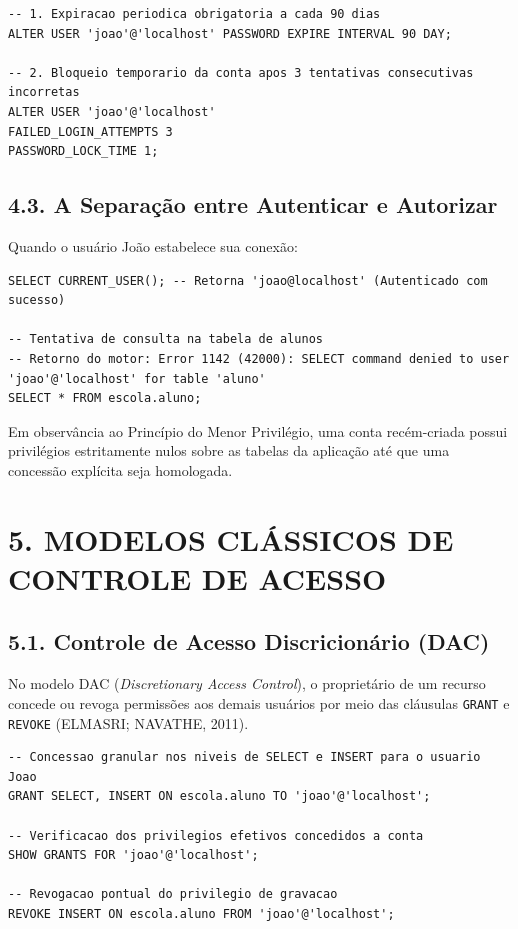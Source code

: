 \begin{lstlisting}
-- 1. Expiracao periodica obrigatoria a cada 90 dias
ALTER USER 'joao'@'localhost' PASSWORD EXPIRE INTERVAL 90 DAY;

-- 2. Bloqueio temporario da conta apos 3 tentativas consecutivas incorretas
ALTER USER 'joao'@'localhost'
FAILED_LOGIN_ATTEMPTS 3
PASSWORD_LOCK_TIME 1;
\end{lstlisting}

\subsection*{4.3. A Separação entre Autenticar e Autorizar}

Quando o usuário João estabelece sua conexão:
\begin{lstlisting}
SELECT CURRENT_USER(); -- Retorna 'joao@localhost' (Autenticado com sucesso)

-- Tentativa de consulta na tabela de alunos
-- Retorno do motor: Error 1142 (42000): SELECT command denied to user 'joao'@'localhost' for table 'aluno'
SELECT * FROM escola.aluno;
\end{lstlisting}

Em observância ao Princípio do Menor Privilégio, uma conta recém-criada possui privilégios estritamente nulos sobre as tabelas da aplicação até que uma concessão explícita seja homologada.

\newpage

\section*{5. MODELOS CLÁSSICOS DE CONTROLE DE ACESSO}

\subsection*{5.1. Controle de Acesso Discricionário (DAC)}

No modelo DAC (\textit{Discretionary Access Control}), o proprietário de um recurso concede ou revoga permissões aos demais usuários por meio das cláusulas \texttt{GRANT} e \texttt{REVOKE} (ELMASRI; NAVATHE, 2011).

\begin{lstlisting}
-- Concessao granular nos niveis de SELECT e INSERT para o usuario Joao
GRANT SELECT, INSERT ON escola.aluno TO 'joao'@'localhost';

-- Verificacao dos privilegios efetivos concedidos a conta
SHOW GRANTS FOR 'joao'@'localhost';

-- Revogacao pontual do privilegio de gravacao
REVOKE INSERT ON escola.aluno FROM 'joao'@'localhost';
\end{lstlisting}

